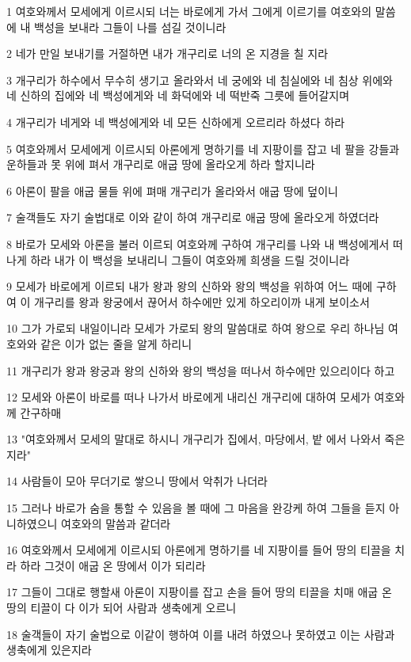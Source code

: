 \par 1 여호와께서 모세에게 이르시되 너는 바로에게 가서 그에게 이르기를 여호와의 말씀에 내 백성을 보내라 그들이 나를 섬길 것이니라
\par 2 네가 만일 보내기를 거절하면 내가 개구리로 너의 온 지경을 칠 지라
\par 3 개구리가 하수에서 무수히 생기고 올라와서 네 궁에와 네 침실에와 네 침상 위에와 네 신하의 집에와 네 백성에게와 네 화덕에와 네 떡반죽 그릇에 들어갈지며
\par 4 개구리가 네게와 네 백성에게와 네 모든 신하에게 오르리라 하셨다 하라
\par 5 여호와께서 모세에게 이르시되 아론에게 명하기를 네 지팡이를 잡고 네 팔을 강들과 운하들과 못 위에 펴서 개구리로 애굽 땅에 올라오게 하라 할지니라
\par 6 아론이 팔을 애굽 물들 위에 펴매 개구리가 올라와서 애굽 땅에 덮이니
\par 7 술객들도 자기 술법대로 이와 같이 하여 개구리로 애굽 땅에 올라오게 하였더라
\par 8 바로가 모세와 아론을 불러 이르되 여호와께 구하여 개구리를 나와 내 백성에게서 떠나게 하라 내가 이 백성을 보내리니 그들이 여호와께 희생을 드릴 것이니라
\par 9 모세가 바로에게 이르되 내가 왕과 왕의 신하와 왕의 백성을 위하여 어느 때에 구하여 이 개구리를 왕과 왕궁에서 끊어서 하수에만 있게 하오리이까 내게 보이소서
\par 10 그가 가로되 내일이니라 모세가 가로되 왕의 말씀대로 하여 왕으로 우리 하나님 여호와와 같은 이가 없는 줄을 알게 하리니
\par 11 개구리가 왕과 왕궁과 왕의 신하와 왕의 백성을 떠나서 하수에만 있으리이다 하고
\par 12 모세와 아론이 바로를 떠나 나가서 바로에게 내리신 개구리에 대하여 모세가 여호와께 간구하매
\par 13 "여호와께서 모세의 말대로 하시니 개구리가 집에서, 마당에서, 밭 에서 나와서 죽은지라"
\par 14 사람들이 모아 무더기로 쌓으니 땅에서 악취가 나더라
\par 15 그러나 바로가 숨을 통할 수 있음을 볼 때에 그 마음을 완강케 하여 그들을 듣지 아니하였으니 여호와의 말씀과 같더라
\par 16 여호와께서 모세에게 이르시되 아론에게 명하기를 네 지팡이를 들어 땅의 티끌을 치라 하라 그것이 애굽 온 땅에서 이가 되리라
\par 17 그들이 그대로 행할새 아론이 지팡이를 잡고 손을 들어 땅의 티끌을 치매 애굽 온 땅의 티끌이 다 이가 되어 사람과 생축에게 오르니
\par 18 술객들이 자기 술법으로 이같이 행하여 이를 내려 하였으나 못하였고 이는 사람과 생축에게 있은지라
